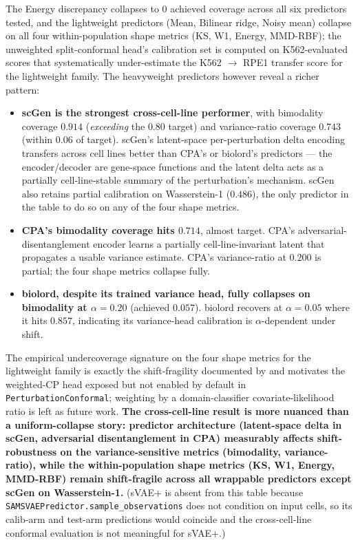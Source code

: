\documentclass{article}
\begin{document}
The Energy discrepancy collapses to $0$ achieved coverage across all six predictors tested, and the lightweight predictors (Mean, Bilinear ridge, Noisy mean) collapse on all four within-population shape metrics (KS, W1, Energy, MMD-RBF); the unweighted split-conformal head's calibration set is computed on K562-evaluated scores that systematically under-estimate the K562 $\rightarrow$ RPE1 transfer score for the lightweight family. The heavyweight predictors however reveal a richer pattern:
\begin{itemize}
\item \textbf{scGen is the strongest cross-cell-line performer}, with bimodality coverage $0.914$ (\emph{exceeding} the $0.80$ target) and variance-ratio coverage $0.743$ (within $0.06$ of target). scGen's latent-space per-perturbation delta encoding transfers across cell lines better than CPA's or biolord's predictors --- the encoder/decoder are gene-space functions and the latent delta acts as a partially cell-line-stable summary of the perturbation's mechanism. scGen also retains partial calibration on Wasserstein-1 ($0.486$), the only predictor in the table to do so on any of the four shape metrics.
\item \textbf{CPA's bimodality coverage hits $0.714$}, almost target. CPA's adversarial-disentanglement encoder learns a partially cell-line-invariant latent that propagates a usable variance estimate. CPA's variance-ratio at $0.200$ is partial; the four shape metrics collapse fully.
\item \textbf{biolord, despite its trained variance head, fully collapses on bimodality at $\alpha = 0.20$} (achieved $0.057$). biolord recovers at $\alpha = 0.05$ where it hits $0.857$, indicating its variance-head calibration is $\alpha$-dependent under shift.
\end{itemize}
The empirical undercoverage signature on the four shape metrics for the lightweight family is exactly the shift-fragility documented by \citet{tibshirani2019} and motivates the weighted-CP head exposed but not enabled by default in \texttt{PerturbationConformal}; weighting by a domain-classifier covariate-likelihood ratio is left as future work. \textbf{The cross-cell-line result is more nuanced than a uniform-collapse story: predictor architecture (latent-space delta in scGen, adversarial disentanglement in CPA) measurably affects shift-robustness on the variance-sensitive metrics (bimodality, variance-ratio), while the within-population shape metrics (KS, W1, Energy, MMD-RBF) remain shift-fragile across all wrappable predictors except scGen on Wasserstein-1.} (sVAE+ is absent from this table because \texttt{SAMSVAEPredictor.sample\_observations} does not condition on input cells, so its calib-arm and test-arm predictions would coincide and the cross-cell-line conformal evaluation is not meaningful for sVAE+.)
\end{document}

